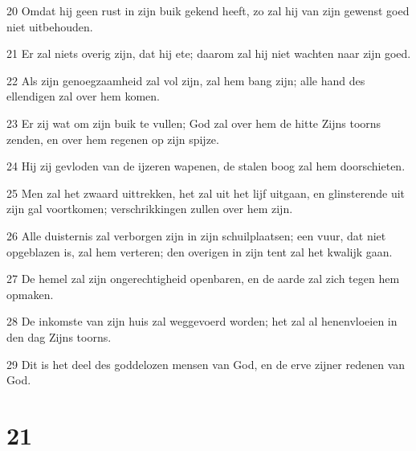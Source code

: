 \par 20 Omdat hij geen rust in zijn buik gekend heeft, zo zal hij van zijn gewenst goed niet uitbehouden.
\par 21 Er zal niets overig zijn, dat hij ete; daarom zal hij niet wachten naar zijn goed.
\par 22 Als zijn genoegzaamheid zal vol zijn, zal hem bang zijn; alle hand des ellendigen zal over hem komen.
\par 23 Er zij wat om zijn buik te vullen; God zal over hem de hitte Zijns toorns zenden, en over hem regenen op zijn spijze.
\par 24 Hij zij gevloden van de ijzeren wapenen, de stalen boog zal hem doorschieten.
\par 25 Men zal het zwaard uittrekken, het zal uit het lijf uitgaan, en glinsterende uit zijn gal voortkomen; verschrikkingen zullen over hem zijn.
\par 26 Alle duisternis zal verborgen zijn in zijn schuilplaatsen; een vuur, dat niet opgeblazen is, zal hem verteren; den overigen in zijn tent zal het kwalijk gaan.
\par 27 De hemel zal zijn ongerechtigheid openbaren, en de aarde zal zich tegen hem opmaken.
\par 28 De inkomste van zijn huis zal weggevoerd worden; het zal al henenvloeien in den dag Zijns toorns.
\par 29 Dit is het deel des goddelozen mensen van God, en de erve zijner redenen van God.

\chapter{21}

